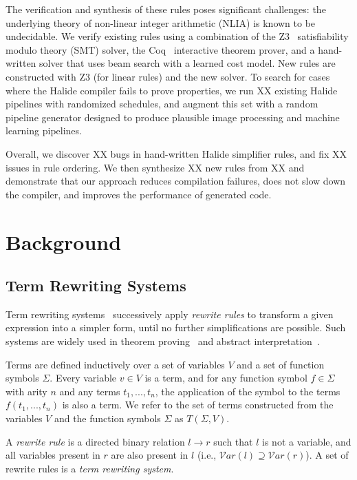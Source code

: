 \documentclass[sigplan,review,anonymous]{acmart}\settopmatter{printfolios=true,printccs=false,printacmref=false}
\newcommand{\NumApps}{{\color{red} XX}\xspace}
\newcommand{\NumRulesFixed}{{\color{red} XX}\xspace}
\newcommand{\NumOrderingFixed}{{\color{red} XX}\xspace}
\newcommand{\NumRulesSynthesized}{{\color{red} XX}\xspace}
\newcommand{\NumFailureExamples}{{\color{red} XX}\xspace}
\begin{document}
The verification and synthesis
of these rules poses significant challenges: the underlying theory of non-linear integer arithmetic (NLIA)
is known to be undecidable.  We verify existing rules using a combination of the Z3~\cite{de2008z3} satisfiability
modulo theory (SMT) solver, the Coq~\cite{coq19} interactive theorem prover, and a hand-written solver
that uses beam search with a learned cost model.  New rules are constructed with Z3 (for linear rules)
and the new solver.  To search for cases where the Halide compiler fails to prove properties, we run
\NumApps existing Halide pipelines with randomized schedules, and augment this set with a random pipeline
generator designed to produce plausible image processing and machine learning pipelines.

Overall, we discover \NumRulesFixed bugs in hand-written Halide simplifier rules, and fix \NumOrderingFixed
issues in rule ordering.  We then synthesize \NumRulesSynthesized new rules from \NumFailureExamples and
demonstrate that our approach reduces compilation failures, does not slow down the compiler, and improves
the performance of generated code.

\section{Background}
\subsection{Term Rewriting Systems}
Term rewriting systems~\cite{gorn1967} successively apply \textit{rewrite rules} to transform a given
expression into a simpler form, until no further simplifications are possible.  Such systems are widely
used in theorem proving~\cite{} and abstract interpretation~\cite{}.

Terms are defined inductively over a set of variables $V$ and a set of function symbols $\Sigma$. Every variable $v \in V$ is a term, and for any function symbol $f \in \Sigma$ with arity $n$ and any terms $t_1, ..., t_n$, the application of the symbol to the terms $f(t_1, ..., t_n)$ is also a term. We refer to the set of terms constructed from the variables $V$ and the function symbols $\Sigma$ as $T(\Sigma, V)$.

A \emph{rewrite rule} is a directed binary relation $l \rightarrow r$ such that $l$ is not a variable, and all variables present in $r$ are also present in $l$ (i.e., $\mathcal{V}ar(l) \supseteq \mathcal{V}ar(r)$). A set of rewrite rules is a \emph{term rewriting system}.
\end{document}
